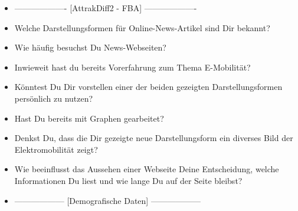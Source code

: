 {\begin{itemize}[]
    \item {-------------------} [AttrakDiff2 - FBA] {-------------------}
    \item {} Welche Darstellungsformen für Online-News-Artikel sind Dir bekannt?
    \item {} Wie häufig besuchst Du News-Webseiten?
    \item {} Inwieweit hast du bereits Vorerfahrung zum Thema E-Mobilität?
    \item {} Könntest Du Dir vorstellen einer der beiden gezeigten Darstellungsformen persönlich zu nutzen?
    \item {} Hast Du bereits mit Graphen gearbeitet?
    \item {} Denkst Du, dass die Dir gezeigte neue Darstellungsform ein diverses Bild der Elektromobilität zeigt?
    \item {} Wie beeinflusst das Aussehen einer Webseite Deine Entscheidung, welche Informationen Du liest und wie lange Du auf der Seite bleibst?
    \item {------------------} [Demografische Daten] {------------------}
\end{itemize}}
\nolinenumbers
